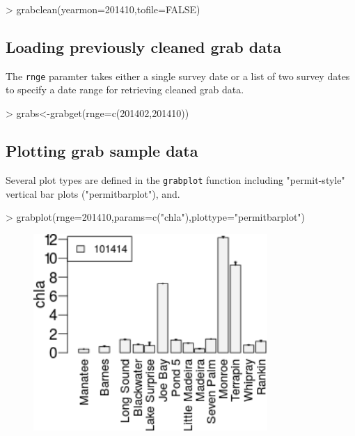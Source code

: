 \documentclass[12pt]{article}
\begin{document}
\begin{Schunk}
\begin{Sinput}
> grabclean(yearmon=201410,tofile=FALSE)
\end{Sinput}
\end{Schunk}

\subsection{Loading previously cleaned grab data}

The \texttt{rnge} paramter takes either a single survey date or a list of two survey dates to specify a date range for retrieving cleaned grab data.

\begin{Schunk}
\begin{Sinput}
> grabs<-grabget(rnge=c(201402,201410))
\end{Sinput}
\end{Schunk}

\subsection{Plotting grab sample data}

Several plot types are defined in the \texttt{grabplot} function including "permit-style" vertical bar plots ("permitbarplot"), and.

\begin{Schunk}
\begin{Sinput}
> grabplot(rnge=201410,params=c("chla"),plottype="permitbarplot")
\end{Sinput}
\end{Schunk}

 \begin{figure}[h!]
 \begin{center}
 \includegraphics[width=3.5in,keepaspectratio=true]{figure1}
 \end{center}
 \label{fig:one}
 \end{figure}
\end{document}
